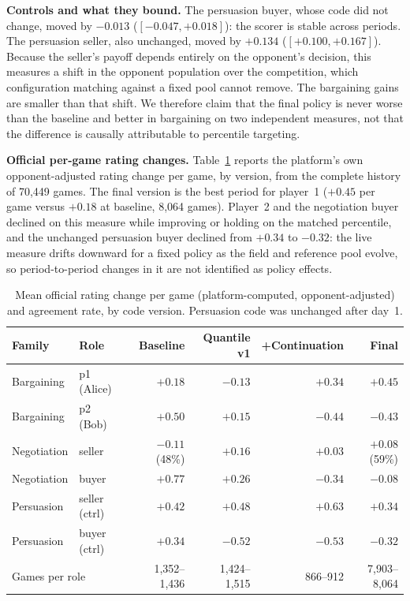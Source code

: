 \documentclass{article}
\begin{document}
\textbf{Controls and what they bound.} The persuasion buyer, whose code did
not change, moved by $-0.013$ ($[-0.047,+0.018]$): the scorer is stable across
periods. The persuasion seller, also unchanged, moved by $+0.134$
($[+0.100,+0.167]$). Because the seller's payoff depends entirely on the
opponent's decision, this measures a shift in the opponent population over the
competition, which configuration matching against a fixed pool cannot remove.
The bargaining gains are smaller than that shift. We therefore claim that the
final policy is never worse than the baseline and better in bargaining on two
independent measures, not that the difference is causally attributable to
percentile targeting.

\textbf{Official per-game rating changes.} Table~\ref{tab:official} reports
the platform's own opponent-adjusted rating change per game, by version, from
the complete history of 70{,}449 games. The final version is the best period
for player~1 ($+0.45$ per game versus $+0.18$ at baseline, 8{,}064 games).
Player~2 and the negotiation buyer declined on this measure while improving
or holding on the matched percentile, and the unchanged persuasion buyer
declined from $+0.34$ to $-0.32$: the live measure drifts downward for a fixed
policy as the field and reference pool evolve, so period-to-period changes in
it are not identified as policy effects.

\begin{table}[t]
  \centering
  \small
  \caption{Mean official rating change per game (platform-computed,
  opponent-adjusted) and agreement rate, by code version. Persuasion code was
  unchanged after day~1.}
  \label{tab:official}
  \begin{tabular}{llrrrr}
    \toprule
    Family & Role & Baseline & Quantile v1 & +Continuation & Final \\
    \midrule
    Bargaining & p1 (Alice) & $+0.18$ & $-0.13$ & $+0.34$ & $\mathbf{+0.45}$ \\
    Bargaining & p2 (Bob)   & $+0.50$ & $+0.15$ & $-0.44$ & $-0.43$ \\
    Negotiation & seller & $-0.11$ (48\%) & $+0.16$ & $+0.03$ & $+0.08$ (59\%) \\
    Negotiation & buyer  & $+0.77$ & $+0.26$ & $-0.34$ & $-0.08$ \\
    Persuasion & seller (ctrl) & $+0.42$ & $+0.48$ & $+0.63$ & $+0.34$ \\
    Persuasion & buyer (ctrl)  & $+0.34$ & $-0.52$ & $-0.53$ & $-0.32$ \\
    \midrule
    \multicolumn{2}{l}{Games per role} & 1{,}352--1{,}436 & 1{,}424--1{,}515 & 866--912 & 7{,}903--8{,}064 \\
    \bottomrule
  \end{tabular}
\end{table}
\end{document}
